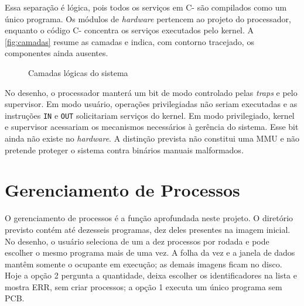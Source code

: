 \documentclass[
    12pt,
    openright,
    a4paper,
    english,
    brazilian
]{abntex2}
\begin{document}
Essa separação é lógica, pois todos os serviços em C- são compilados como um único programa. Os módulos de \emph{hardware} pertencem ao projeto do processador, enquanto o código C- concentra os serviços executados pelo kernel. A \autoref{fig:camadas} resume as camadas e indica, com contorno tracejado, os componentes ainda ausentes.

\begin{figure}[H]
\centering
\caption{Camadas lógicas do sistema}
\label{fig:camadas}
\end{figure}

No desenho, o processador manterá um bit de modo controlado pelas \emph{traps} e pelo supervisor. Em modo usuário, operações privilegiadas não seriam executadas e as instruções \texttt{IN} e \texttt{OUT} solicitariam serviços do kernel. Em modo privilegiado, kernel e supervisor acessariam os mecanismos necessários à gerência do sistema. Esse bit ainda não existe no \emph{hardware}. A distinção prevista não constitui uma MMU e não pretende proteger o sistema contra binários manuais malformados.

\section{Gerenciamento de Processos}

O gerenciamento de processos é a função aprofundada neste projeto. O diretório previsto contém até dezesseis programas, dez deles presentes na imagem inicial. No desenho, o usuário seleciona de um a dez processos por rodada e pode escolher o mesmo programa mais de uma vez. A folha da vez e a janela de dados mantêm somente o ocupante em execução; as demais imagens ficam no disco. Hoje a opção 2 pergunta a quantidade, deixa escolher os identificadores na lista e mostra ERR, sem criar processos; a opção 1 executa um único programa sem PCB.
\end{document}
